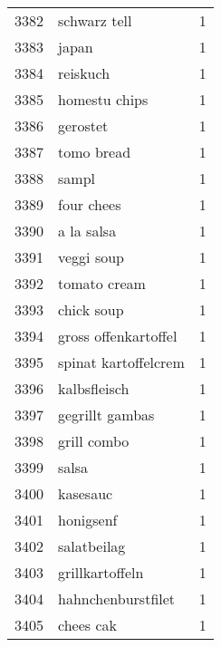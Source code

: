 \begin{tabular}{llr}
3382 &                                       schwarz tell &      1 \\
3383 &                                              japan &      1 \\
3384 &                                           reiskuch &      1 \\
3385 &                                      homestu chips &      1 \\
3386 &                                           gerostet &      1 \\
3387 &                                         tomo bread &      1 \\
3388 &                                              sampl &      1 \\
3389 &                                         four chees &      1 \\
3390 &                                         a la salsa &      1 \\
3391 &                                         veggi soup &      1 \\
3392 &                                       tomato cream &      1 \\
3393 &                                         chick soup &      1 \\
3394 &                               gross offenkartoffel &      1 \\
3395 &                               spinat kartoffelcrem &      1 \\
3396 &                                       kalbsfleisch &      1 \\
3397 &                                    gegrillt gambas &      1 \\
3398 &                                        grill combo &      1 \\
3399 &                                              salsa &      1 \\
3400 &                                           kasesauc &      1 \\
3401 &                                          honigsenf &      1 \\
3402 &                                        salatbeilag &      1 \\
3403 &                                    grillkartoffeln &      1 \\
3404 &                                 hahnchenburstfilet &      1 \\
3405 &                                          chees cak &      1 \\

\end{tabular}
